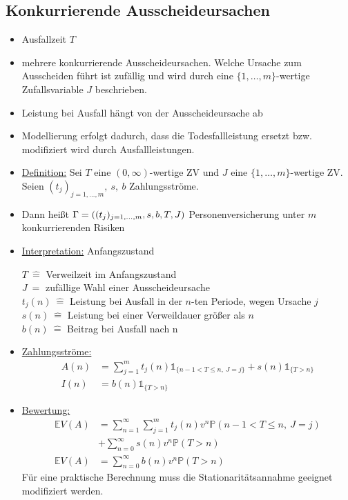 \subsection{Konkurrierende Ausscheideursachen}
\label{sub:ausscheideursachen}
\begin{itemize}
	\item Ausfallzeit $T$
	\item mehrere konkurrierende Ausscheideursachen. Welche Ursache zum Ausscheiden führt ist zufällig und wird durch eine $\{1,\dots,m\}$-wertige Zufallsvariable $J$ beschrieben.
	\item Leistung bei Ausfall hängt von der Ausscheideursache ab
	\item Modellierung erfolgt dadurch, dass die Todesfallleistung ersetzt bzw. modifiziert wird durch Ausfallleistungen.
	\item \uline{Definition:} Sei $T$ eine $(0,\infty)$-wertige ZV und $J$ eine $\{1,\dots,m\}$-wertige ZV. Seien $(t_j)_{j=1,\dots,m},~s,~b$ Zahlungsströme.
	\item Dann heißt $\Gamma=\left( (t_j)_{j=1,\dots,m},s,b,T,J\right)$ Personenversicherung unter $m$ konkurrierenden Risiken
	\item \uline{Interpretation:} Anfangszustand\\
	\begin{center}
		$T~\mathrel{\hat{=}}$ Verweilzeit im Anfangszustand\\
		$J~\mathrel{\hat{=}}$ zufällige Wahl einer Ausscheideursache\\
		$t_j(n)~\mathrel{\hat{=}}$ Leistung bei Ausfall in der $n$-ten Periode, wegen Ursache $j$\\
		$s(n)~\mathrel{\hat{=}}$ Leistung bei einer Verweildauer größer als $n$\\
		$b(n)~\mathrel{\hat{=}}$ Beitrag bei Ausfall nach n
	\end{center}
	\item \uline{Zahlungsströme:}
	\begin{equation*}
	\begin{aligned}
		A(n) &= \sum_{j=1}^{m}t_j(n)\mathbb{1}_{\{n-1<T\le n,~J=j \}}+s(n)\mathbb{1}_{\{T>n\}}\\
		I(n) &= b(n)\mathbb{1}_{\{T>n\}}
	\end{aligned}
	\end{equation*}
	\item \uline{Bewertung:}
	\begin{equation*}
	\begin{aligned}
		\mathds{E}V(A) &= \sum_{n=1}^{\infty}\sum_{j=1}^{m}t_j(n)v^n\mathds{P}(n-1<T\le n,~J=j)\\
		&+ \sum_{n=0}^{\infty}s(n)v^n\mathds{P}(T>n)\\
		\mathds{E}V(A) &= \sum_{n=0}^{\infty}b(n)v^n\mathds{P}(T>n)
	\end{aligned}
	\end{equation*}
	Für eine praktische Berechnung muss die Stationaritätsannahme geeignet modifiziert werden.\\
\end{itemize}

